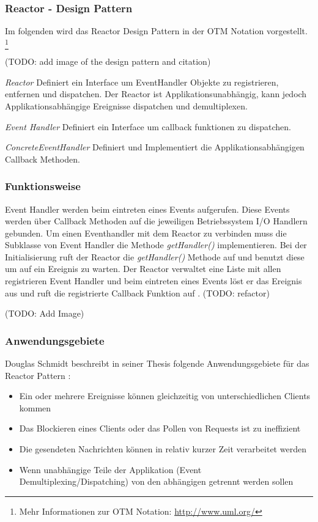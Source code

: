 \subsubsection{Reactor - Design Pattern}

Im folgenden wird das Reactor Design Pattern in der OTM Notation vorgestellt. \footnote[0]{Mehr Informationen zur OTM Notation: \url{http://www.uml.org/}}

(TODO: add image of the design pattern and citation)

\cite[p. 2]{Sch95}

\emph{Reactor}
	Definiert ein Interface um EventHandler Objekte zu registrieren, entfernen und dispatchen. Der Reactor ist Applikationsunabhängig, kann jedoch Applikationsabhängige Ereignisse dispatchen und demultiplexen. 

\emph{Event Handler}
	Definiert ein Interface um callback funktionen zu dispatchen. 

\emph{ConcreteEventHandler}
	Definiert und Implementiert die Applikationsabhängigen Callback Methoden. 


\subsubsection{Funktionsweise}
Event Handler werden beim eintreten eines Events aufgerufen. Diese Events werden über Callback Methoden auf die jeweiligen Betriebssystem I/O Handlern gebunden. Um einen Eventhandler mit dem Reactor zu verbinden muss die Subklasse von Event Handler die Methode \emph{getHandler()} implementieren. Bei der Initialisierung ruft der Reactor die \emph{getHandler()} Methode auf und benutzt diese um auf ein Ereignis zu warten. Der Reactor verwaltet eine Liste mit allen registrieren Event Handler und beim eintreten eines Events löst er das Ereignis aus und ruft die registrierte Callback Funktion auf \cite[p. 5]{Sch95}. (TODO: refactor)


(TODO: Add Image)


\subsubsection{Anwendungsgebiete}

Douglas Schmidt beschreibt in seiner Thesis folgende Anwendungsgebiete für das Reactor Pattern \cite[p. 4]{Sch95}:

\begin{itemize}
  \item Ein oder mehrere Ereignisse können gleichzeitig von unterschiedlichen Clients kommen
  \item Das Blockieren eines Clients oder das Pollen von Requests ist zu ineffizient
  \item Die gesendeten Nachrichten können in relativ kurzer Zeit verarbeitet werden
  \item Wenn unabhängige Teile der Applikation (Event Demultiplexing/Dispatching) von den abhängigen getrennt werden sollen
\end{itemize}



